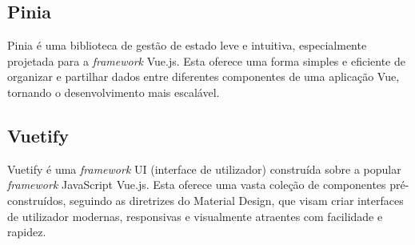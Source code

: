 \documentclass[12pt,a4paper,final]{article}
\begin{document}
    \subsection{Pinia}\label{subsec:pinia}
    Pinia é uma biblioteca de gestão de estado leve e intuitiva, especialmente projetada para a \textit{framework} Vue.js.
    Esta oferece uma forma simples e eficiente de organizar e partilhar dados entre diferentes componentes de uma aplicação Vue, tornando o desenvolvimento mais escalável.

    \subsection{Vuetify}\label{subsec:vuetify}
    Vuetify é uma \textit{framework} UI (interface de utilizador) construída sobre a popular \textit{framework} JavaScript Vue.js.
    Esta oferece uma vasta coleção de componentes pré-construídos, seguindo as diretrizes do Material Design, que visam criar interfaces de utilizador modernas, responsivas e visualmente atraentes com facilidade e rapidez.


    \nocite{*}
    \newpage
    \printbibliography
\end{document}
